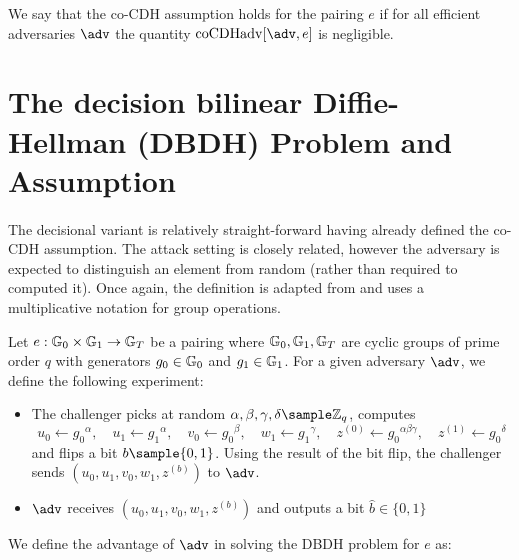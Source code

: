 	\begin{definition}
		We say that the co-CDH assumption holds for the pairing $e$ if for all efficient adversaries $\adv$ the quantity $\mathrm{coCDHadv}[\adv, e]$ is negligible.
	\end{definition}
	
\section{The decision bilinear Diffie-Hellman (DBDH) Problem and Assumption}

\paragraph{} The decisional variant is relatively straight-forward having already defined the co-CDH assumption. The attack setting is closely related, however the adversary is expected to distinguish an element from random (rather than required to computed it). Once again, the definition is adapted from \cite{BonehShoup} and uses a multiplicative notation for group operations.

\begin{secgame}\label{att:DBDH}
	Let $e : \mathbb{G}_0 \times \mathbb{G}_1 \rightarrow \mathbb{G}_T$ be a pairing where $\mathbb{G}_0,\mathbb{G}_1,\mathbb{G}_T$ are cyclic groups of prime order $q$ with generators $g_0 \in \mathbb{G}_0$ and $g_1 \in \mathbb{G}_1$. For a given adversary $\adv$, we define the following experiment:
	
	\begin{itemize}
		\item The challenger picks at random $ \alpha, \beta, \gamma, \delta \sample \mathbb{Z}_q $,
			computes $$ u_0 \leftarrow {g_0}^\alpha, \quad u_1 \leftarrow {g_1}^\alpha, \quad v_0 \leftarrow {g_0}^\beta, \quad w_1 \leftarrow {g_1}^\gamma, \quad z^{(0)} \leftarrow {g_0}^{\alpha\beta\gamma}, \quad z^{(1)} \leftarrow {g_0}^\delta $$
			and flips a bit $b\sample\{0,1\}$. Using the result of the bit flip, the challenger sends $(u_0, u_1, v_0, w_1, z^{(b)})$ to $\adv$.
		\item $\adv$ receives $(u_0, u_1, v_0, w_1, z^{(b)})$ and outputs a bit $\hat b \in \{0,1\}$
	\end{itemize}
\end{secgame}

\noindent We define the advantage of $\adv$ in solving the DBDH problem for $e$ as:

